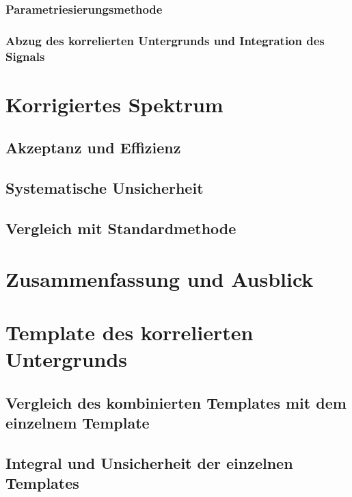 \documentclass[a4paper,11pt,twoside]{report}
\renewcommand{\,}{,\!} %
\begin{document}
\subsection{Parametriesierungsmethode} \label{s3s5s3}


\subsection{Abzug des korrelierten Untergrunds und Integration des Signals} \label{s3s5s4}


\chapter{Korrigiertes Spektrum} \label{s4}

\section{Akzeptanz und Effizienz} \label{s4s1}


\section{Systematische Unsicherheit} \label{s4s2}


\section{Vergleich mit Standardmethode} \label{s4s3}


\chapter{Zusammenfassung und Ausblick} \label{s5}

\clearpage

\appendix
\chapter{Template des korrelierten Untergrunds} \label{Appendix:A}
\section{Vergleich des kombinierten Templates mit dem einzelnem Template} \label{Appendix:A1}

\newpage
\section{Integral und Unsicherheit der einzelnen Templates} \label{Appendix:A2}

\newpage
 

\clearpage
\end{document}
